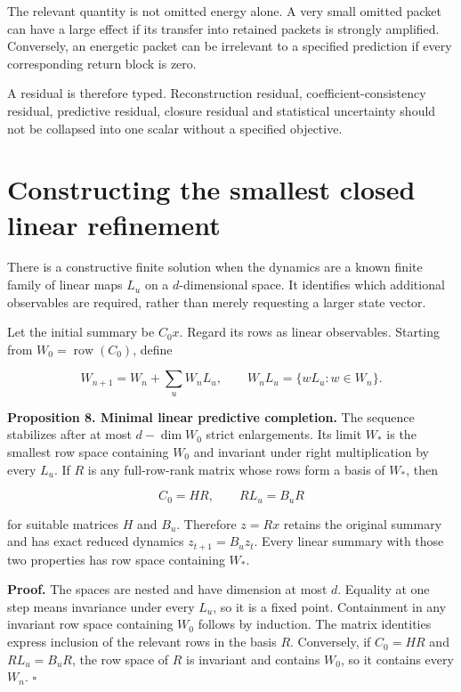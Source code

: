 The relevant quantity is not omitted energy alone. A very small omitted
packet can have a large effect if its transfer into retained packets is
strongly amplified. Conversely, an energetic packet can be irrelevant to
a specified prediction if every corresponding return block is zero.

A residual is therefore typed. Reconstruction residual,
coefficient-consistency residual, predictive residual, closure residual
and statistical uncertainty should not be collapsed into one scalar
without a specified objective.

\section{Constructing the smallest closed linear refinement}\label{LSM:constructing-the-smallest-closed-linear-refinement}

There is a constructive finite solution when the dynamics are a known
finite family of linear maps \(L_u\) on a \(d\)-dimensional space. It
identifies which additional observables are required, rather than merely
requesting a larger state vector.

Let the initial summary be \(C_0x\). Regard its rows as linear
observables. Starting from \(W_0=\operatorname{row}(C_0)\), define

\[
W_{n+1}=W_n+\sum_uW_nL_u,
\qquad W_nL_u=\{wL_u:w\in W_n\}.
\]

\textbf{Proposition 8. Minimal linear predictive completion.} The
sequence stabilizes after at most \(d-\dim W_0\) strict enlargements.
Its limit \(W_*\) is the smallest row space containing \(W_0\) and
invariant under right multiplication by every \(L_u\). If \(R\) is any
full-row-rank matrix whose rows form a basis of \(W_*\), then

\[
C_0=HR,\qquad RL_u=B_uR
\]

for suitable matrices \(H\) and \(B_u\). Therefore \(z=Rx\) retains the
original summary and has exact reduced dynamics \(z_{t+1}=B_uz_t\).
Every linear summary with those two properties has row space containing
\(W_*\).

\textbf{Proof.} The spaces are nested and have dimension at most \(d\).
Equality at one step means invariance under every \(L_u\), so it is a
fixed point. Containment in any invariant row space containing \(W_0\)
follows by induction. The matrix identities express inclusion of the
relevant rows in the basis \(R\). Conversely, if \(C_0=HR\) and
\(RL_u=B_uR\), the row space of \(R\) is invariant and contains \(W_0\),
so it contains every \(W_n\). \(\square\)

